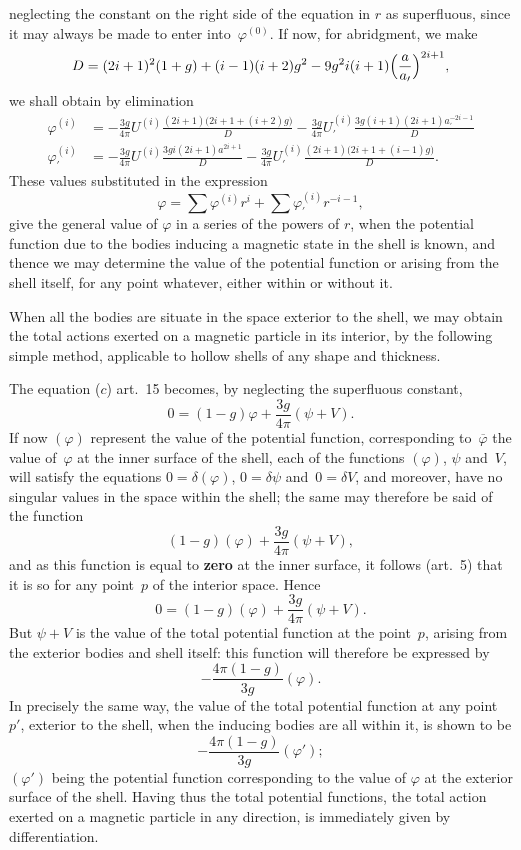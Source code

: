 \documentclass[11pt,notitlepage]{amsart}
\let\Emphasis\textbf
\renewcommand{\phi}{\varphi}
\begin{document}
neglecting the constant on the right side of the equation in $r$ as superfluous,
since it may always be made to enter into~$\phi^{(0)}$. If now, for abridgment,
we make
\[
D=(2i+1)^2(1+g)+(i-1)(i+2)g^2-9g^2i(i+1)\Bigl(\frac{a}{a_\prime}\Bigr)^{2i+1},
\]
we shall obtain by elimination
\[
\begin{aligned}
\phi^{(i)} &=
-\frac{3g}{4\pi}U^{(i)}\frac{(2i+1)\bigl(2i+1+(i+2)g\bigr)}{D}
-\frac{3g}{4\pi}U_\prime^{(i)}\frac{3g(i+1)(2i+1)a_\prime^{-2i-1}}{D}\\
\phi_\prime^{(i)} &=
-\frac{3g}{4\pi}U^{(i)}\frac{3gi(2i+1)a^{2i+1}}{D}
-\frac{3g}{4\pi}U_\prime^{(i)}\frac{(2i+1)\bigl(2i+1+(i-1)g\bigr)}{D}.
\end{aligned}
\]
These values substituted in the expression
\[
\phi=\sum\phi^{(i)}r^i+\sum\phi_\prime^{(i)}r^{-i-1},
\]
give the general value of $\phi$ in a series of the powers of $r$,
when the potential
function due to the bodies inducing a magnetic state in the shell is known,
and thence we may determine the value of the potential function or arising
from the shell itself, for any point whatever, either within or without it.

When all the bodies are situate in the space exterior to the shell, we
may obtain the total actions exerted on a magnetic particle in its interior, by
the following simple method, applicable to hollow shells of any shape and
thickness.

The equation ($c$) art.~15 becomes, by neglecting the superfluous constant,
\[
0=(1-g)\phi+\frac{3g}{4\pi}(\psi+V).
\]
If now $(\phi)$ represent the value of the potential function,
corresponding to~$\overline\phi$
the value of~$\phi$ at the inner surface of the shell,
each of the functions $(\phi)$,
$\psi$ and~$V$, will satisfy the equations
$0=\delta(\phi)$, $0=\delta\psi$ and~$0=\delta V$, and
moreover, have no singular values in the space within the shell; the same
may therefore be said of the function
\[
(1-g)(\phi)+\frac{3g}{4\pi}(\psi+V),
\]
and as this function is equal to \Emphasis{zero} at the inner surface,
it follows (art.~5)
that it is so for any point~$p$ of the interior space. Hence
\[
0=(1-g)(\phi)+\frac{3g}{4\pi}(\psi+V).
\]
But $\psi+V$ is the value of the total potential function at the point~$p$,
arising
from the exterior bodies and shell itself: this function will therefore be 
expressed by
\[
-\frac{4\pi(1-g)}{3g}(\phi).
\]
In precisely the same way, the value of the total potential function at any
point~$p'$, exterior to the shell,
when the inducing bodies are all within it, is
shown to be
\[
-\frac{4\pi(1-g)}{3g}(\phi');
\]
$(\phi')$ being the potential function
corresponding to the value of $\phi$ at the exterior
surface of the shell. Having thus the total potential functions, the total
action exerted on a magnetic particle in any direction, is immediately given
by differentiation.
\end{document}
